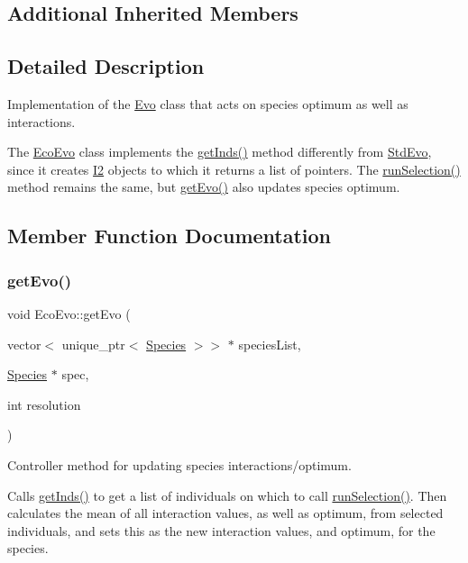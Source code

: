 \subsection*{Additional Inherited Members}


\subsection{Detailed Description}
Implementation of the \hyperlink{classEvo}{Evo} class that acts on species optimum as well as interactions. 

The \hyperlink{classEcoEvo}{Eco\+Evo} class implements the \hyperlink{classEcoEvo_a819363c533784efea949ebc70a6d4636}{get\+Inds()} method differently from \hyperlink{classStdEvo}{Std\+Evo}, since it creates \hyperlink{classI2}{I2} objects to which it returns a list of pointers. The \hyperlink{classEcoEvo_adfd00eb377489649a279e567abc3ae94}{run\+Selection()} method remains the same, but \hyperlink{classEcoEvo_a93564a6d93cdc1802182273c353e0552}{get\+Evo()} also updates species optimum. 

\subsection{Member Function Documentation}
\mbox{\label{classEcoEvo_a93564a6d93cdc1802182273c353e0552}} 
\subsubsection{\texorpdfstring{get\+Evo()}{getEvo()}}
{\footnotesize\ttfamily void Eco\+Evo\+::get\+Evo (\begin{DoxyParamCaption}\item[{vector$<$ unique\+\_\+ptr$<$ \hyperlink{classSpecies}{Species} $>$$>$ $\ast$}]{species\+List,  }\item[{\hyperlink{classSpecies}{Species} $\ast$}]{spec,  }\item[{int}]{resolution }\end{DoxyParamCaption})\hspace{0.3cm}{\ttfamily [virtual]}}



Controller method for updating species interactions/optimum. 

Calls \hyperlink{classEcoEvo_a819363c533784efea949ebc70a6d4636}{get\+Inds()} to get a list of individuals on which to call \hyperlink{classEcoEvo_adfd00eb377489649a279e567abc3ae94}{run\+Selection()}. Then calculates the mean of all interaction values, as well as optimum, from selected individuals, and sets this as the new interaction values, and optimum, for the species.


